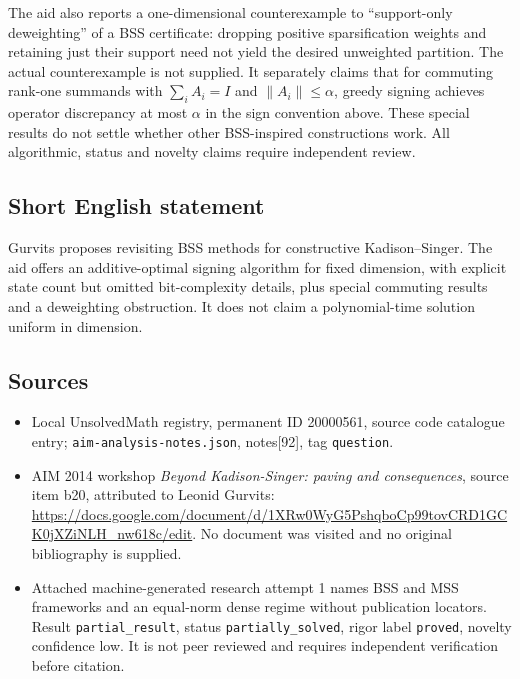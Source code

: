 \documentclass[11pt]{article}
\begin{document}
The aid also reports a one-dimensional counterexample to ``support-only deweighting'' of a BSS certificate: dropping positive sparsification weights and retaining just their support need not yield the desired unweighted partition. The actual counterexample is not supplied. It separately claims that for commuting rank-one summands with $\sum_iA_i=I$ and $\|A_i\|\le\alpha$, greedy signing achieves operator discrepancy at most $\alpha$ in the sign convention above. These special results do not settle whether other BSS-inspired constructions work. All algorithmic, status and novelty claims require independent review.
\subsection{Short English statement}
Gurvits proposes revisiting BSS methods for constructive Kadison--Singer. The aid offers an additive-optimal signing algorithm for fixed dimension, with explicit state count but omitted bit-complexity details, plus special commuting results and a deweighting obstruction. It does not claim a polynomial-time solution uniform in dimension.
\subsection{Sources}
\begin{itemize}
\item Local UnsolvedMath registry, permanent ID 20000561, source code catalogue entry; \texttt{aim-analysis-notes.json}, notes[92], tag \texttt{question}.
\item AIM 2014 workshop \emph{Beyond Kadison-Singer: paving and consequences}, source item b20, attributed to Leonid Gurvits: \url{https://docs.google.com/document/d/1XRw0WyG5PshqboCp99tovCRD1GCK0jXZiNLH_nw618c/edit}. No document was visited and no original bibliography is supplied.
\item Attached machine-generated research attempt 1 names BSS and MSS frameworks and an equal-norm dense regime without publication locators. Result \texttt{partial\_result}, status \texttt{partially\_solved}, rigor label \texttt{proved}, novelty confidence low. It is not peer reviewed and requires independent verification before citation.
\end{itemize}
\end{document}
